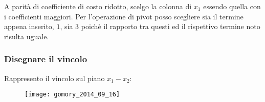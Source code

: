 \documentclass[\main/main.tex]{subfiles}
\begin{document}
A parità di coefficiente di costo ridotto, scelgo la colonna di $x_1$ essendo quella con i coefficienti maggiori. Per l'operazione di pivot posso scegliere sia il termine appena inserito, $1$, sia $3$ poichè il rapporto tra questi ed il rispettivo termine noto risulta uguale.

\subsubsection*{Disegnare il vincolo}
Rappresento il vincolo sul piano $x_1 - x_2$:

\begin{figure}
  \texttt{[image: gomory\_2014\_09\_16]}
\end{figure}
\end{document}
